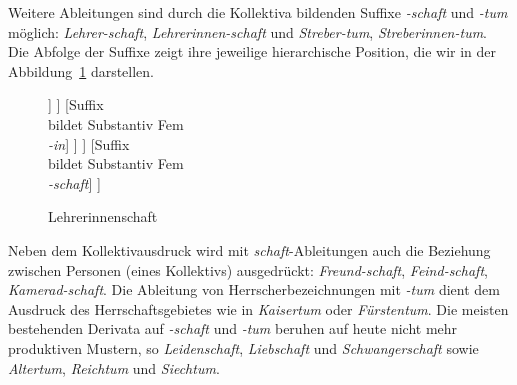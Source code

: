 \label{subsubsection:schaft}

Weitere Ableitungen sind durch die Kollektiva bildenden Suffixe  \textit{-schaft} und  \textit{-tum} möglich: \textit{Lehrer-schaft}, \textit{Lehrerinnen-schaft} und \textit{Streber-tum}, \textit{Streberinnen-tum}. Die Abfolge der Suffixe zeigt ihre jeweilige hierarchische Position, die wir in der Abbildung~\ref{Abb:Lehrerinnenschaft} darstellen. 


	\begin{figure}
		\centering
	\begin{forest}
	[Stammform \\ Substantiv Fem \\ \textit{Lehrerinnenschaft} [Derivationsstammform \\ Substantiv Fem \\\textit{lehrerinnen} [Stammform \\ Substantiv Fem \\ \textit{Lehrerin} [Derivationsstammform \\ Substantiv Mask \\ \textit{lehrer} [Stammform \\ Substantiv Mask \\ \textit{Lehrer} [Derivationsstammform \\ Verb \\ \textit{lehr}] [Suffix \\ bildet Substantiv Mask \\ \textit{-er}] ] ] [Suffix \\ bildet Substantiv Fem \\ \textit{-in}]  ] ] [Suffix \\ bildet Substantiv Fem \\ \textit{-schaft}]  ]
	\end{forest}
	\caption{Lehrerinnenschaft}\label{Abb:Lehrerinnenschaft}
\end{figure}

Neben dem Kollektivausdruck wird mit \textit{schaft}-Ableitungen auch die Beziehung zwischen Personen (eines Kollektivs) ausgedrückt: \textit{Freund-schaft}, \textit{Feind-schaft}, \textit{Kamerad-schaft}. Die Ableitung von Herrscherbezeichnungen mit \textit{-tum} dient dem Ausdruck des Herrschaftsgebietes wie in \textit{Kaisertum} oder \textit{Fürstentum}. Die meisten bestehenden Derivata auf \textit{-schaft} und \textit{-tum} beruhen auf heute nicht mehr produktiven Mustern, so \zB \textit{Leidenschaft}, \textit{Liebschaft} und \textit{Schwangerschaft} sowie \textit{Altertum}, \textit{Reichtum} und \textit{Siechtum}.


